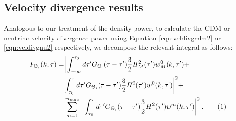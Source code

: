 \documentclass[twocolumn,superscriptaddress,prd]{revtex4}
\newcommand\numberthis{\addtocounter{equation}{1}\tag{\theequation}}
\begin{document}
\subsection{ Velocity divergence results }

Analogous to our treatment of the density power, to calculate
the CDM or neutrino velocity divergence power using
Equation \eqref{eqn:veldivgcdm2} or 
\eqref{eqn:veldivgnu2} 
respectively, we decompose the relevant integral as follows:
\begin{align*}\label{eqn:veldecomp}
  P_{\Theta_i}( k, \tau) =& \bigg| \int_{-\infty}^{\tau_0} d \tau'
                            G_{\Theta_i}(\tau-\tau') \frac{3}{2}
                            H_M^2(\tau') w_M^0(k,\tau')  +
  \\ &
  \int_{\tau_0}^\tau d\tau' G_{\Theta_i}(\tau-\tau') \frac{3}{2} H^2(\tau')
  w^0(k,\tau') \bigg|^2 +\\
& \sum_{m=1}^{m_{max}} \bigg| \int_{\tau_0}^\tau d \tau'
  G_{\Theta_i}(\tau-\tau') \frac{3}{2} H^2(\tau') w^m(k,\tau')
   \bigg|^2 \;. \numberthis
\end{align*}


\end{document}
